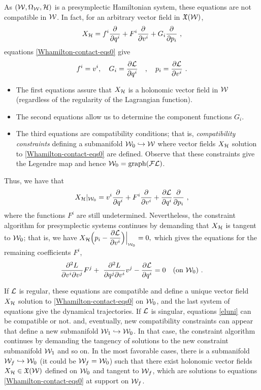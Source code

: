 \documentclass[12pt]{report}
\def\beq{\begin{equation}}
\def\eeq{\end{equation}}
\def\dst{\displaystyle}
\def\derpar#1#2{\frac{\partial{#1}}{\partial{#2}}}
\def\vf{\mathfrak X}
\def\Lag{{\cal L}}
\def\Leg{{\cal F}\Lag}
\begin{document}
As $({\cal W},\Omega_{\cal W},{\cal H})$ is a presymplectic Hamiltonian system,
these equations are not compatible in ${\cal W}$.
In fact, for an arbitrary vector field in $\vf({\cal W})$,
$$
X_{\cal H} =  f^i\derpar{}{q^i}+F^i\derpar{}{v^i}+G_i\derpar{}{p_i} \ ,
$$ 
equations \eqref{Whamilton-contact-eqs0} give
\beq
 f^i= v^i ,\quad
 G_i= \displaystyle \derpar{\Lag}{q^i} \quad ,  \quad
p_i= \derpar{\Lag}{v^i}  \ . 
\label{firstuni}
\eeq
\begin{itemize}
\item
The first equations assure that $X_{\cal H}$ is a holonomic vector field in ${\cal W}$
(regardless of the regularity of the Lagrangian function).
\item
The second equations allow us to determine the component functions $G_i$.
\item
The third equations are compatibility conditions;
that is, {\sl compatibility constraints} defining a submanifold 
${\cal W}_0\hookrightarrow{\cal W}$
where vector fields $X_{\cal H}$ solution to \eqref{Whamilton-contact-eqs0} are defined.
Observe that these constraints give the Legendre map and hence ${\cal W}_0={\rm graph}({\Leg})$.
\end{itemize}
Thus, we have that
$$
X_{\cal H} \vert_{{\cal W}_0}= v^i\derpar{}{q^i}+F^i\derpar{}{v^i}+
\derpar{\Lag}{q^i}\derpar{}{p_i}\ ,
$$
where the functions $F^i$ are still undetermined.
Nevertheless, the constraint algorithm for presymplectic systems continues by demanding that
$X_{\cal H}$ is tangent to ${\cal W}_0$; that is, we have
$\dst{X_{\cal H}\Big(p_i- \derpar{\Lag}{v^i}\Big)}\Big\vert_{_{{\cal W}_0}} = 0,$
which gives the equations for the remaining coefficients $F^i$,
\beq
 \frac{\partial^2L}{\partial v^i\partial v^j}F^j+ \ \frac{\partial^2L}{\partial q^j\partial v^i}v^j- \derpar{\Lag}{q^i}=0 \quad (\text{on } \mathcal{W}_0)  \ .
\label{eluni}
\eeq

If $\Lag$ is regular, these equations are compatible and define a unique vector field $X_{\cal H}$ solution to \eqref{Whamilton-contact-eqs0} on ${\cal W}_0$,
and the last system of equations give the dynamical trajectories.
If $\Lag$ is singular, equations \eqref{eluni} can be compatible or not.
and, eventually, new compatibility constraints can appear
that define a new submanifold ${\cal W}_1\hookrightarrow{\cal W}_0$.
In that case, the constraint algorithm continues by demanding the tangency of solutions to the new constraint submanifold ${\cal W}_1$ and so on. 
In the most favorable cases,
there is a submanifold ${\cal W}_f \hookrightarrow {\cal W}_0$ (it could be ${\cal W}_f = {\cal W}_0$)
such that there exist holonomic vector fields $X_{\cal H}\in\vf({\cal W})$ defined on ${\cal W}_0$ and tangent to ${\cal W}_f$,
which are solutions to equations \eqref{Whamilton-contact-eqs0}
at support on ${\cal W}_f$.
\end{document}

